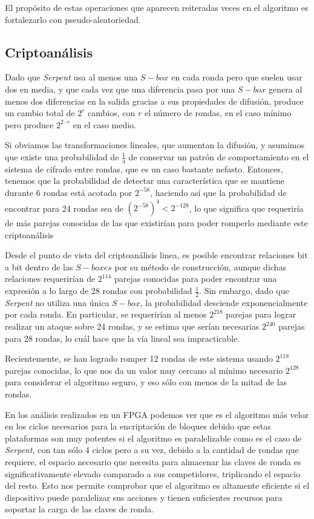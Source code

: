 El propósito de estas operaciones que aparecen reiteradas veces en el algoritmo es fortalezarlo con pseudo-aleatoriedad.\cite{Serpent_AES}

\subsection{Criptoanálisis}
Dado que \textit{Serpent} usa al menos una $S-box$ en cada ronda pero que suelen usar dos en media, y que cada vez que una diferencia pasa por una $S-box$ genera al menos dos diferencias en la salida gracias a sus propiedades de difusión, produce un cambio total de $2^r$ cambios, con $r$ el número de rondas, en el caso mínimo pero produce $2^{2 \cdot r}$ en el caso medio.

Si obviamos las transformaciones lineales, que aumentan la difusión, y asumimos que existe una probabilidad de $\frac{1}{4}$ de conservar un patrón de comportamiento en el sistema de cifrado entre rondas, que es un caso bastante nefasto. Entonces, tenemos que la probabilidad de detectar una característica que se mantiene durante 6 rondas está acotada por $2^{-58}$, haciendo así que la probabilidad de encontrar para 24 rondas sea de $\left(2^{-58}\right)^4 < 2^{-128}$, lo que significa que requeriría de más parejas conocidas de las que existirían para poder romperlo mediante este criptoanálisis

Desde el punto de vista del criptoanálisis linea, es posible encontrar relaciones bit a bit dentro de las \textit{$S-boxes$} por su método de construcción, aunque dichas relaciones requerirían de $2^{114}$ parejas conocidas para poder encontrar una expresión a lo largo de 28 rondas con probabilidad $\frac{1}{2}$. Sin embargo, dado que \textit{Serpent} no utiliza una única \textit{$S-box$}, la probabilidad desciende exponencialmente por cada ronda. En particular, se requerirían al menos $2^{218}$ parejas para lograr realizar un ataque sobre 24 rondas, y se estima que serían necesarias $2^{240}$ parejas para 28 rondas, lo cuál hace que la vía lineal sea impracticable.\cite{Serpent_AES}

Recientemente, se han logrado romper 12 rondas de este sistema usando $2^{118}$ parejas conocidas, lo que nos da un valor muy cercano al mínimo necesario $2^{128}$ para considerar el algoritmo seguro, y eso sólo con menos de la mitad de las rondas.

En los análisis realizados en un FPGA\cite{FPGA_Finalists} podemos ver que es el algoritmo más veloz en los ciclos necesarios para la encriptación de bloques debido que estas plataformas son muy potentes si el algoritmo es paralelizable como es el caso de \textit{Serpent}, con tan sólo 4 ciclos pero a su vez, debido a la cantidad de rondas que requiere, el espacio necesario que necesita para almacenar las claves de ronda es significativamente elevado comparado a sus competidores, triplicando el espacio del resto. Esto nos permite comprobar que el algoritmo es altamente eficiente si el dispositivo puede paralelizar sus acciones y tienen suficientes recursos para soportar la carga de las claves de ronda.

